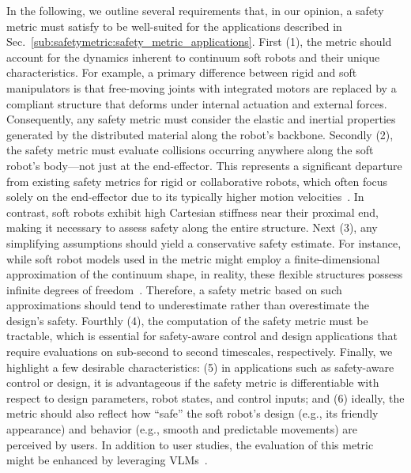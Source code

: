 In the following, we outline several requirements that, in our opinion, a safety metric must satisfy to be well-suited for the applications described in Sec.~\ref{sub:safetymetric:safety_metric_applications}. First (1), the metric should account for the dynamics inherent to continuum soft robots and their unique characteristics. For example, a primary difference between rigid and soft manipulators is that free-moving joints with integrated motors are replaced by a compliant structure that deforms under internal actuation and external forces. Consequently, any safety metric must consider the elastic and inertial properties generated by the distributed material along the robot’s backbone.
%
Secondly (2), the safety metric must evaluate collisions occurring anywhere along the soft robot’s body—not just at the end-effector. This represents a significant departure from existing safety metrics for rigid or collaborative robots, which often focus solely on the end-effector due to its typically higher motion velocities~\citep{haddadin2009requirements, haddadin2011safe, iso2016collaborative}. In contrast, soft robots exhibit high Cartesian stiffness near their proximal end, making it necessary to assess safety along the entire structure.
% 
Next (3), any simplifying assumptions should yield a conservative safety estimate. For instance, while soft robot models used in the metric might employ a finite-dimensional approximation of the continuum shape, in reality, these flexible structures possess infinite degrees of freedom~\citep{della2023model, armanini2023soft}. Therefore, a safety metric based on such approximations should tend to underestimate rather than overestimate the design’s safety.
% 
Fourthly (4), the computation of the safety metric must be tractable, which is essential for safety-aware control and design applications that require evaluations on sub-second to second timescales, respectively.
% 
Finally, we highlight a few desirable characteristics: (5) in applications such as safety-aware control or design, it is advantageous if the safety metric is differentiable with respect to design parameters, robot states, and control inputs; and (6) ideally, the metric should also reflect how “safe” the soft robot’s design (e.g., its friendly appearance) and behavior (e.g., smooth and predictable movements) are perceived by users. In addition to user studies, the evaluation of this metric might be enhanced by leveraging \glspl{VLM}~\citep{touvron2023llama, grattafiori2024llama}.